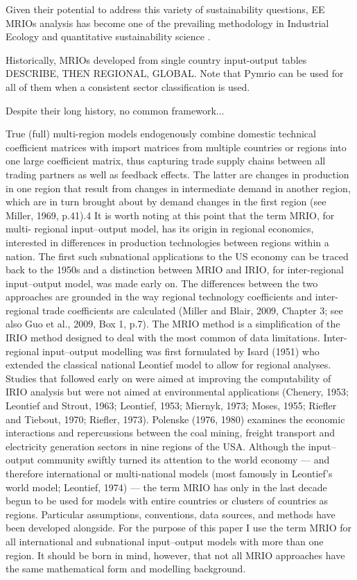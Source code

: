 \documentclass{jors}
\begin{document}
{Given their potential to address this variety of sustainability questions, EE MRIOs analysis has become one of the prevailing methodology in Industrial Ecology and quantitative sustainability science \cite{davis2010_Consumptionbased, ivanova2017_Mapping, tukker2016_Environmental, verones2015_Harmonizing, wood2018_Growth, wood2018_Prioritizing}.

Historically, MRIOs developed from single country input-output tables 
DESCRIBE, THEN REGIONAL, GLOBAL. Note that Pymrio can be used for all of them when a consistent sector classification is used.

Despite their long history, no common framework...


True (full) multi-region models endogenously combine domestic
technical coefficient matrices with import matrices from multiple
countries or regions into one large coefficient matrix, thus capturing
trade supply chains between all trading partners as well as feedback
effects. The latter are changes in production in one region that result
from changes in intermediate demand in another region, which are in
turn brought about by demand changes in the first region (see Miller,
1969, p.41).4
It is worth noting at this point that the term MRIO, for multi-
regional input–output model, has its origin in regional economics,
interested in differences in production technologies between regions
within a nation. The first such subnational applications to the US
economy can be traced back to the 1950s and a distinction between
MRIO and IRIO, for inter-regional input–output model, was made
early on. The differences between the two approaches are grounded in
the way regional technology coefficients and inter-regional trade
coefficients are calculated (Miller and Blair, 2009, Chapter 3; see also
Guo et al., 2009, Box 1, p.7). The MRIO method is a simplification of the
IRIO method designed to deal with the most common of data
limitations.
Inter-regional input–output modelling was first formulated by
Isard (1951) who extended the classical national Leontief model to
allow for regional analyses. Studies that followed early on were aimed
at improving the computability of IRIO analysis but were not aimed at
environmental applications (Chenery, 1953; Leontief and Strout,
1963; Leontief, 1953; Miernyk, 1973; Moses, 1955; Riefler and
Tiebout, 1970; Riefler, 1973). Polenske (1976, 1980) examines the
economic interactions and repercussions between the coal mining,
freight transport and electricity generation sectors in nine regions of
the USA.
Although the input–output community swiftly turned its attention
to the world economy — and therefore international or multi-national
models (most famously in Leontief's world model; Leontief, 1974) —
the term MRIO has only in the last decade begun to be used for models
with entire countries or clusters of countries as regions. Particular
assumptions, conventions, data sources, and methods have been
developed alongside. For the purpose of this paper I use the term
MRIO for all international and subnational input–output models with
more than one region. It should be born in mind, however, that not all
MRIO approaches have the same mathematical form and modelling
background.


}
\end{document}
